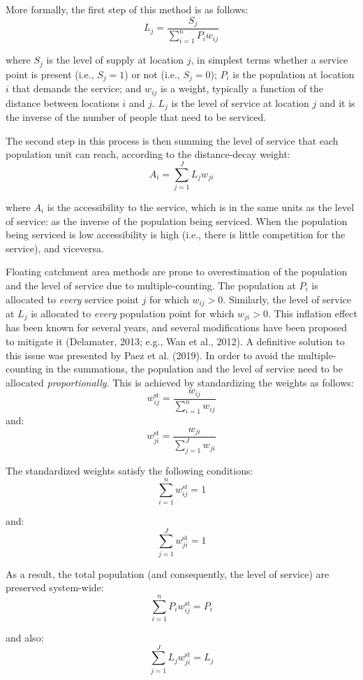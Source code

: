 \documentclass[]{elsarticle} %
\begin{document}
More formally, the first step of this method is as follows: \[
L_j = \frac{S_j}{\sum_{i=1}^nP_iw_{ij}}
\]

\noindent where \(S_j\) is the level of supply at location \(j\), in
simplest terms whether a service point is present (i.e., \(S_j=1\)) or
not (i.e., \(S_j=0\)); \(P_i\) is the population at location \(i\) that
demands the service; and \(w_{ij}\) is a weight, typically a function of
the distance between locations \(i\) and \(j\). \(L_j\) is the level of
service at location \(j\) and it is the inverse of the number of people
that need to be serviced.

The second step in this process is then summing the level of service
that each population unit can reach, according to the distance-decay
weight: \[
A_i = \sum_{j=1}^JL_jw_{ji}
\]

\noindent where \(A_i\) is the accessibility to the service, which is in
the same units as the level of service: as the inverse of the population
being serviced. When the population being serviced is low accessibility
is high (i.e., there is little competition for the service), and
viceversa.

Floating catchment area methods are prone to overestimation of the
population and the level of service due to multiple-counting. The
population at \(P_i\) is allocated to \emph{every} service point \(j\)
for which \(w_{ij}>0\). Similarly, the level of service at \(L_j\) is
allocated to \emph{every} population point for which \(w_{ji}>0\). This
inflation effect has been known for several years, and several
modifications have been proposed to mitigate it (Delamater, 2013; e.g.,
Wan et al., 2012). A definitive solution to this issue was presented by
Paez et al. (2019). In order to avoid the multiple-counting in the
summations, the population and the level of service need to be allocated
\emph{proportionally}. This is achieved by standardizing the weights as
follows: \[
w_{ij}^\text{st} = \frac{w_{ij}}{\sum_{i=1}^nw_{ij}}
\] \noindent and: \[
w_{ji}^\text{st} = \frac{w_{ji}}{\sum_{j=1}^Jw_{ji}}
\]

The standardized weights satisfy the following conditions: \[
\sum_{i=1}^nw_{ij}^\text{st}=1
\]

\noindent and: \[
\sum_{j=1}^Jw_{ji}^\text{st}=1
\]

As a result, the total population (and consequently, the level of
service) are preserved system-wide: \[
\sum_{i=1}^nP_iw_{ij}^\text{st}=P_i
\]

\noindent and also: \[
\sum_{j=1}^JL_jw_{ji}^\text{st}=L_j
\]
\end{document}
